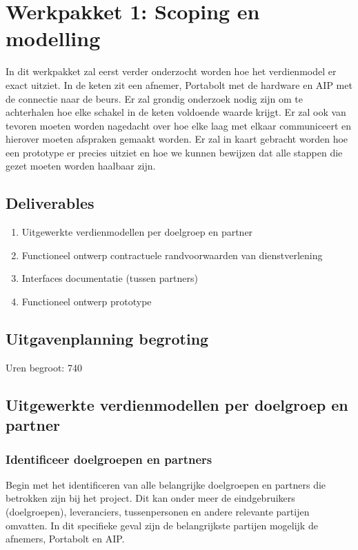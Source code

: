 \documentclass[../main.tex]{subfiles}
\begin{document}
\section{Werkpakket 1: Scoping en modelling}
In dit werkpakket zal eerst verder onderzocht worden hoe het verdienmodel er exact uitziet. In de keten zit een afnemer, Portabolt met de hardware en AIP met de connectie naar de beurs. Er zal grondig onderzoek nodig zijn om te achterhalen hoe elke schakel in de keten voldoende waarde krijgt. Er zal ook van tevoren moeten worden nagedacht over hoe elke laag met elkaar communiceert en hierover moeten afspraken gemaakt worden. Er zal in kaart gebracht worden hoe een prototype er precies uitziet en hoe we kunnen bewijzen dat alle stappen die gezet moeten worden haalbaar zijn.

\subsection{Deliverables}
\begin{enumerate}
    \item Uitgewerkte verdienmodellen per doelgroep en partner
    \item Functioneel ontwerp contractuele randvoorwaarden van dienstverlening
    \item Interfaces documentatie (tussen partners)
    \item Functioneel ontwerp prototype
\end{enumerate}

\subsection{Uitgavenplanning begroting}
Uren begroot: 740

\subsection{Uitgewerkte verdienmodellen per doelgroep en partner}

\subsubsection{Identificeer doelgroepen en partners}
Begin met het identificeren van alle belangrijke doelgroepen en partners die betrokken zijn bij het project. Dit kan onder meer de eindgebruikers (doelgroepen), leveranciers, tussenpersonen en andere relevante partijen omvatten. In dit specifieke geval zijn de belangrijkste partijen mogelijk de afnemers, Portabolt en AIP.
\end{document}
